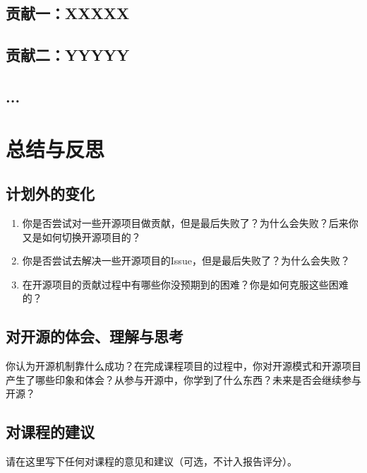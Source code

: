 \documentclass[lang=cn,11pt,a4paper,cite=authoryear]{elegantpaper}
\begin{document}
\subsection{贡献一：XXXXX}

\subsection{贡献二：YYYYY}

\subsection{...}

\section{总结与反思}

\subsection{计划外的变化}

\begin{tcolorbox}[title=\textbf{请在这一节包含如下内容（如果有）：},colback=yellow!10!white]
\begin{enumerate}
    \item 你是否尝试对一些开源项目做贡献，但是最后失败了？为什么会失败？后来你又是如何切换开源项目的？
    \item 你是否尝试去解决一些开源项目的Issue，但是最后失败了？为什么会失败？
    \item 在开源项目的贡献过程中有哪些你没预期到的困难？你是如何克服这些困难的？
\end{enumerate}
\end{tcolorbox}

\subsection{对开源的体会、理解与思考}

\begin{tcolorbox}[title=\textbf{请在这一节中写下任何你想要表达的内容，下述问题仅供参考：},colback=yellow!10!white]
你认为开源机制靠什么成功？在完成课程项目的过程中，你对开源模式和开源项目产生了哪些印象和体会？从参与开源中，你学到了什么东西？未来是否会继续参与开源？
\end{tcolorbox}

\subsection{对课程的建议}

\begin{tcolorbox}[colback=yellow!10!white]
请在这里写下任何对课程的意见和建议（可选，不计入报告评分）。
\end{tcolorbox}


\nocite{*}

\end{document}
